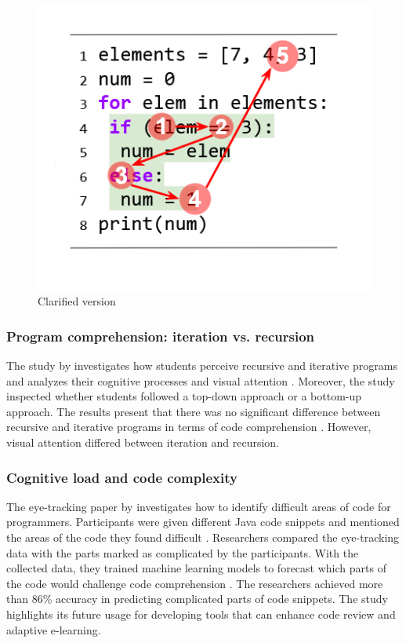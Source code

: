 \begin{figure} [H]
  \centering
  \includegraphics[scale=0.8]{figures/b.png}
  \caption{Clarified version \cite[p. 5]{silva2023evaluating}}
  \label{fig:AnhangsChor}
\end{figure}


\subsubsection{Program comprehension: iteration vs. recursion} 
The study by \citet{aroobaunderstanding} investigates how students perceive recursive and iterative programs and analyzes their cognitive processes and visual attention \cite{aroobaunderstanding}. Moreover, the study inspected whether students followed a top-down approach or a bottom-up approach.
The results present that there was no significant difference between recursive and iterative programs in terms of code comprehension \cite{aroobaunderstanding}.  However, visual attention differed between iteration and recursion. 

\subsubsection{Cognitive load and code complexity} 

The eye-tracking paper by \citet{abbad2022estimating} investigates how to identify difficult areas of code for programmers.  Participants were given different Java code snippets and mentioned the areas of the code they found difficult \cite{abbad2022estimating}. Researchers compared the eye-tracking data with the parts marked as complicated by the participants. With the collected data, they trained machine learning models to forecast which parts of the code would challenge code comprehension \cite{abbad2022estimating}. The researchers achieved more than 86\% accuracy in predicting complicated parts of code snippets. The study highlights its future usage for developing tools that can enhance code review and adaptive e-learning.  



